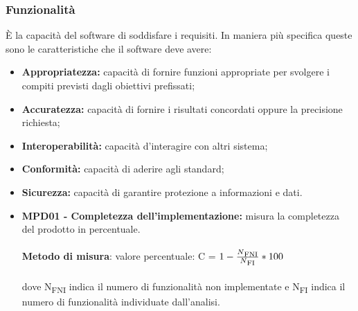 \subsubsection{Funzionalità}
È la capacità del software di soddisfare i requisiti. In maniera più specifica queste sono le caratteristiche che il software deve avere:
\begin{itemize}
    \item \textbf{Appropriatezza:} capacità di fornire funzioni appropriate per svolgere i compiti previsti dagli obiettivi prefissati;
    \item \textbf{Accuratezza:} capacità di fornire i risultati concordati oppure la precisione richiesta;
    \item \textbf{Interoperabilità:} capacità  d'interagire con altri sistema;
    \item \textbf{Conformità:} capacità di aderire agli standard;
    \item \textbf{Sicurezza:} capacità di garantire protezione a informazioni e dati.
\end{itemize}
\begin{itemize}
    \item \textbf{MPD01 - Completezza dell'implementazione:} misura la completezza del prodotto in percentuale.\\
    \\\textbf{Metodo di misura}: valore percentuale: C = $1-\frac{N\textsubscript{FNI}}{N\textsubscript{FI}}*100$ \\
    \\dove N\textsubscript{FNI} indica il numero di funzionalità non implementate e N\textsubscript{FI} indica il numero di funzionalità 
    individuate dall'analisi.
\end{itemize}
